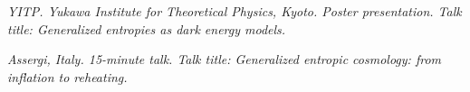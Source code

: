 \resumeSubHeadingListStart
{}
\begin{indentedtext}
\textit{YITP. Yukawa Institute for Theoretical Physics, Kyoto. Poster presentation. Talk title: Generalized entropies as dark energy models.}
\end{indentedtext}
\resumeSubHeadingListEnd

\resumeSubHeadingListStart
{}
\begin{indentedtext}
\textit{Assergi, Italy. 15-minute talk. Talk title: Generalized entropic cosmology: from inflation to reheating.}
\end{indentedtext}
\resumeSubHeadingListEnd
